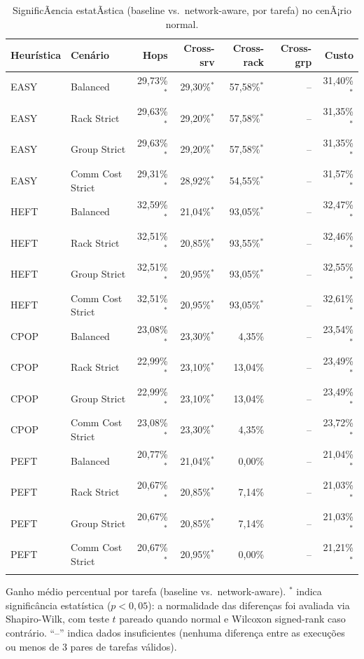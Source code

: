 \begin{table}[htbp]
\centering
\small
\caption{SignificÃ¢ncia estatÃ­stica (baseline vs.\ network-aware, por tarefa) no cenÃ¡rio normal.}
\label{tab:significancia_normal}
\begin{tabular}{llrrrrr}
\toprule
Heurística & Cenário & Hops & Cross-srv & Cross-rack & Cross-grp & Custo \\
\midrule
EASY & Balanced & 29,73\%$^{*}$ & 29,30\%$^{*}$ & 57,58\%$^{*}$ & -- & 31,40\%$^{*}$ \\
EASY & Rack Strict & 29,63\%$^{*}$ & 29,20\%$^{*}$ & 57,58\%$^{*}$ & -- & 31,35\%$^{*}$ \\
EASY & Group Strict & 29,63\%$^{*}$ & 29,20\%$^{*}$ & 57,58\%$^{*}$ & -- & 31,35\%$^{*}$ \\
EASY & Comm Cost Strict & 29,31\%$^{*}$ & 28,92\%$^{*}$ & 54,55\%$^{*}$ & -- & 31,57\%$^{*}$ \\
\addlinespace
HEFT & Balanced & 32,59\%$^{*}$ & 21,04\%$^{*}$ & 93,05\%$^{*}$ & -- & 32,47\%$^{*}$ \\
HEFT & Rack Strict & 32,51\%$^{*}$ & 20,85\%$^{*}$ & 93,55\%$^{*}$ & -- & 32,46\%$^{*}$ \\
HEFT & Group Strict & 32,51\%$^{*}$ & 20,95\%$^{*}$ & 93,05\%$^{*}$ & -- & 32,55\%$^{*}$ \\
HEFT & Comm Cost Strict & 32,51\%$^{*}$ & 20,95\%$^{*}$ & 93,05\%$^{*}$ & -- & 32,61\%$^{*}$ \\
\addlinespace
CPOP & Balanced & 23,08\%$^{*}$ & 23,30\%$^{*}$ & 4,35\% & -- & 23,54\%$^{*}$ \\
CPOP & Rack Strict & 22,99\%$^{*}$ & 23,10\%$^{*}$ & 13,04\% & -- & 23,49\%$^{*}$ \\
CPOP & Group Strict & 22,99\%$^{*}$ & 23,10\%$^{*}$ & 13,04\% & -- & 23,49\%$^{*}$ \\
CPOP & Comm Cost Strict & 23,08\%$^{*}$ & 23,30\%$^{*}$ & 4,35\% & -- & 23,72\%$^{*}$ \\
\addlinespace
PEFT & Balanced & 20,77\%$^{*}$ & 21,04\%$^{*}$ & 0,00\% & -- & 21,04\%$^{*}$ \\
PEFT & Rack Strict & 20,67\%$^{*}$ & 20,85\%$^{*}$ & 7,14\% & -- & 21,03\%$^{*}$ \\
PEFT & Group Strict & 20,67\%$^{*}$ & 20,85\%$^{*}$ & 7,14\% & -- & 21,03\%$^{*}$ \\
PEFT & Comm Cost Strict & 20,67\%$^{*}$ & 20,95\%$^{*}$ & 0,00\% & -- & 21,21\%$^{*}$ \\
\addlinespace
\bottomrule
\end{tabular}

\vspace{2mm}
\footnotesize Ganho médio percentual por tarefa (baseline vs.\ network-aware). $^{*}$ indica significância estatística ($p<0{,}05$): a normalidade das diferenças foi avaliada via Shapiro-Wilk, com teste $t$ pareado quando normal e Wilcoxon signed-rank caso contrário. ``--'' indica dados insuficientes (nenhuma diferença entre as execuções ou menos de 3 pares de tarefas válidos).
\end{table}
